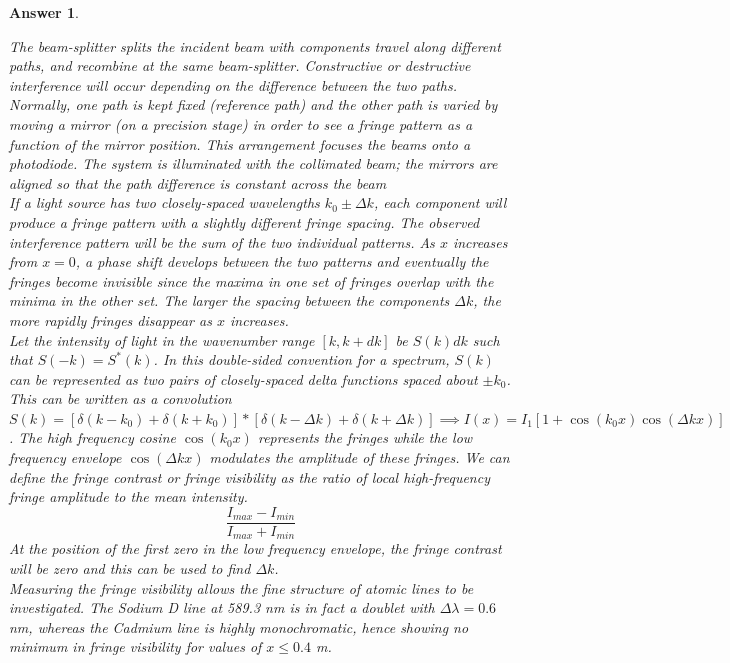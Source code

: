 \documentclass[a4paper]{article}
\newtheorem{ans}{Answer}[subsection]
\theoremstyle{new}
\begin{document}
\begin{ans}
\begin{figure}[H]
\end{figure}
The beam-splitter splits the incident beam with components travel along different paths, and recombine at the same beam-splitter. Constructive or destructive interference will occur depending on the difference between the two paths. Normally, one path is kept fixed (reference path) and the other path is varied by moving a mirror (on a precision stage) in order to see a fringe pattern as a function of the mirror position. This arrangement focuses the beams onto a photodiode. The system is illuminated with the collimated beam; the mirrors are aligned so that the path difference is constant across the beam\\[5pt]
If a light source has two closely-spaced wavelengths $k_0\pm\Delta k$, each component will produce a fringe pattern with a slightly different fringe spacing. The observed interference pattern will be the sum of the two individual patterns. As $x$ increases from $x=0$, a phase shift develops between the two patterns and eventually the fringes become invisible since the maxima in one set of fringes overlap with the minima in the other set. The larger the spacing between the components $\Delta k$, the more rapidly fringes disappear as $x$ increases.\\[5pt]
Let the intensity of light in the wavenumber range $[k,k+dk]$ be $S(k)dk$ such that $S(-k)=S^*(k)$. In this double-sided convention for a spectrum, $S(k)$ can be represented as two pairs of closely-spaced delta functions spaced about $\pm k_0$. This can be written as a convolution $S(k)=[\delta(k-k_0)+\delta(k+k_0)]*[\delta(k-\Delta k)+\delta(k+\Delta k)]\implies I(x)=I_1[1+\cos(k_0x)\cos(\Delta kx)]$. The high frequency cosine $\cos(k_0x)$ represents the fringes while the low frequency envelope $\cos(\Delta kx)$ modulates the amplitude of these fringes. We can define the fringe contrast or fringe visibility as the ratio of local high-frequency fringe amplitude to the mean intensity.
$$\frac{I_{max}-I_{min}}{I_{max}+I_{min}}$$
At the position of the first zero in the low frequency envelope, the fringe contrast will be zero and this can be used to find $\Delta k$.\\[5pt]
Measuring the fringe visibility allows the fine structure of atomic lines to be investigated. The Sodium D line at 589.3 nm is in fact a doublet with $\Delta\lambda=0.6$ nm, whereas the Cadmium line is highly monochromatic, hence showing no minimum in fringe visibility for values of $x\leq 0.4$ m.
\newpage

\end{ans}
\end{document}
